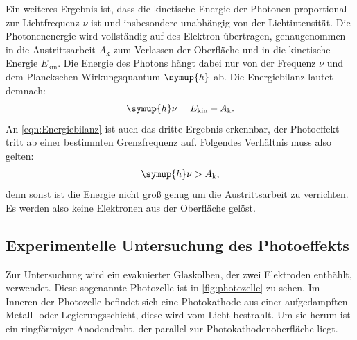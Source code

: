 Ein weiteres Ergebnis ist, dass die kinetische Energie der Photonen proportional zur Lichtfrequenz $\nu$ ist und insbesondere unabhängig von der Lichtintensität.
Die Photonenenergie wird vollständig auf des Elektron übertragen, genaugenommen in die Austrittsarbeit $A_\text{k}$ zum Verlassen der Oberfläche und in die kinetische Energie $E_\text{kin}$.
Die Energie des Photons hängt dabei nur von der Frequenz $\nu$ und dem Planckschen Wirkungsquantum $\symup{h}$ ab.
Die Energiebilanz lautet demnach:
\begin{equation}
    \label{eqn:Energiebilanz}
    \symup{h} \nu = E_\text{kin} + A_\text{k}.
\end{equation}
An \autoref{eqn:Energiebilanz} ist auch das dritte Ergebnis erkennbar, der Photoeffekt tritt ab einer bestimmten Grenzfrequenz auf.
Folgendes Verhältnis muss also gelten:
\begin{equation*}
    \symup{h} \nu > A_\text{k},
\end{equation*}
denn sonst ist die Energie nicht groß genug um die Austrittsarbeit zu verrichten.
Es werden also keine Elektronen aus der Oberfläche gelöst.

\subsection{Experimentelle Untersuchung des Photoeffekts}
\label{subsec:Experimentelle Untersuchung des Photoeffekts mit der Gegenfeldmethode}

Zur Untersuchung wird ein evakuierter Glaskolben, der zwei Elektroden enthählt, verwendet.
Diese sogenannte Photozelle ist in \autoref{fig:photozelle} zu sehen.
Im Inneren der Photozelle befindet sich eine Photokathode aus einer aufgedampften Metall- oder Legierungsschicht, diese wird vom Licht bestrahlt.
Um sie herum ist ein ringförmiger Anodendraht, der parallel zur Photokathodenoberfläche liegt.

